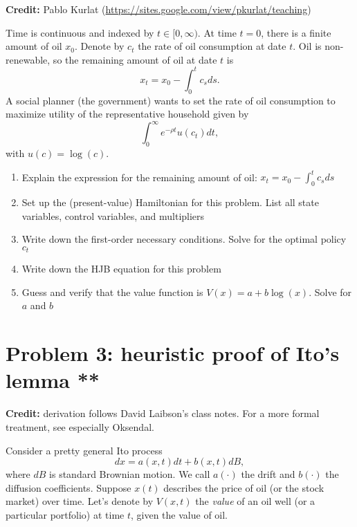 \documentclass[11pt]{extarticle}
\theoremstyle{plain}
\theoremstyle{definition}
\begin{document}
\textbf{Credit:} Pablo Kurlat (\url{https://sites.google.com/view/pkurlat/teaching})


\vspace{5mm}
\noindent
Time is continuous and indexed by $t \in [0, \infty)$. At time $t=0$, there is a finite amount of oil $x_0$. Denote by $c_t$ the rate of oil consumption at date $t$. Oil is non-renewable, so the remaining amount of oil at date $t$ is 
\begin{equation*}
	x_t = x_0 - \int_0^t c_s ds.
\end{equation*}
A social planner (the government) wants to set the rate of oil consumption to maximize utility of the representative household given by
\begin{equation*}
	\int_0^\infty e^{- \rho t} u(c_t) dt,
\end{equation*}
with $u(c) = \log(c)$. 

\begin{enumerate}
\item Explain the expression for the remaining amount of oil: $x_t = x_0 - \int_0^t c_s ds$

\item Set up the (present-value) Hamiltonian for this problem. List all state variables, control variables, and multipliers

\item Write down the first-order necessary conditions. Solve for the optimal policy $c_t$

\item Write down the HJB equation for this problem

\item Guess and verify that the value function is $V(x) = a + b \log(x)$. Solve for $a$ and $b$
\end{enumerate}




\vspace{10mm}
\section*{Problem 3: heuristic proof of Ito's lemma **}

\textbf{Credit:} derivation follows David Laibson's class notes. For a more formal treatment, see especially Oksendal. 

\vspace{5mm}
\noindent
Consider a pretty general Ito process
\begin{equation*}
	dx = a(x, t) dt + b(x, t) dB,
\end{equation*}
where $dB$ is standard Brownian motion. We call $a(\cdot)$ the drift and $b(\cdot)$ the diffusion coefficients. Suppose $x(t)$ describes the price of oil (or the stock market) over time. Let's denote by $V(x, t)$ the \textit{value} of an oil well (or a particular portfolio) at time $t$, given the value of oil. 
\end{document}

